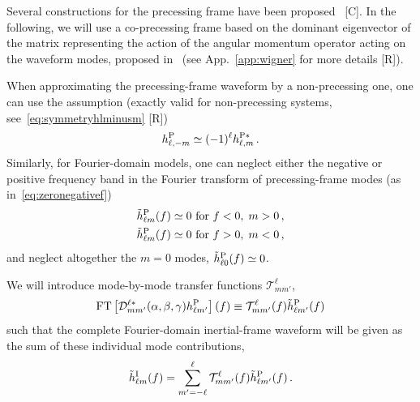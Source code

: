 \documentclass[aps,showpacs,twocolumn,
prd,superscriptaddress,nofootinbib]{revtex4-1}
\newcommand{\be}{\begin{equation}}
\newcommand{\ee}{\end{equation}}
\newcommand\calT{{\mathcal{T}}}
\newcommand\calD{{\mathcal{D}}}
\newcommand{\nn}{\nonumber}
\newcommand{\SM}[1]{{\color{Red} #1}}
\begin{document}
Several constructions for the precessing frame have been proposed~\cite{} \SM{[C]}. In the following, we will use a co-precessing frame based on the dominant eigenvector of the matrix representing the action of the angular momentum operator acting on the waveform modes, proposed in~\cite{OShaughnessy+11} (see App.~\ref{app:wigner} for more details \SM{[R]}).

When approximating the precessing-frame waveform by a non-precessing one, one can use the assumption (exactly valid for non-precessing systems, see~\eqref{eq:symmetryhlminusm} \SM{[R]})
\be\label{eq:approxsymmetryhlminusm}
	h^{\rm P}_{\ell,-m} \simeq (-1)^{\ell} h^{\rm P*}_{\ell,m} \,.
\ee
Similarly, for Fourier-domain models, one can neglect either the negative or positive frequency band in the Fourier transform of precessing-frame modes (as in~\eqref{eq:zeronegativef})
\begin{align}\label{eq:approxzeronegativef}
	\tilde{h}_{\ell m}^{\rm P} (f) &\simeq 0 \text{ for } f<0, \; m>0 \nn\,,\\
	\tilde{h}_{\ell m}^{\rm P} (f) &\simeq 0 \text{ for } f>0, \; m<0 \,,
\end{align}
and neglect altogether the $m=0$ modes, $\tilde{h}_{\ell 0}^{\rm P} (f) \simeq 0$.

We will introduce mode-by-mode transfer functions $\calT^{\ell}_{mm'}$,
\be\label{eq:defprectransfer}
	\mathrm{FT} \left[ \calD^{\ell *}_{mm'} (\alpha,\beta,\gamma) h_{\ell m'}^{\rm P} \right] (f) \equiv \calT^{\ell}_{mm'}(f) \tilde{h}_{\ell m'}^{\rm P} (f)
\ee
such that the complete Fourier-domain inertial-frame waveform will be given as the sum of these individual mode contributions,
\be\label{eq:defprechIsum}
	\tilde{h}_{\ell m}^{\rm I} (f) = \sum\limits_{m'=-\ell}^{\ell} \calT^{\ell}_{mm'}(f) \tilde{h}_{\ell m'}^{\rm P} (f) \,.
\ee
\end{document}
